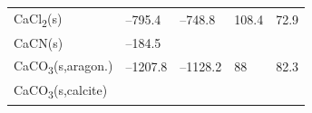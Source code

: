 \documentclass[
]{book}
\theoremstyle{definition}
\theoremstyle{definition}
\theoremstyle{definition}
\theoremstyle{remark}
\begin{document}
\begin{longtable}[]{@{}lllll@{}}
\begin{minipage}[t]{0.10\columnwidth}
CaCl\textsubscript{2}(s)\strut
\end{minipage} & \begin{minipage}[t]{0.19\columnwidth}\raggedright
--795.4\strut
\end{minipage} & \begin{minipage}[t]{0.20\columnwidth}\raggedright
--748.8\strut
\end{minipage} & \begin{minipage}[t]{0.18\columnwidth}\raggedright
108.4\strut
\end{minipage} & \begin{minipage}[t]{0.18\columnwidth}\raggedright
72.9\strut
\end{minipage}\tabularnewline
\begin{minipage}[t]{0.10\columnwidth}\raggedright
CaCN(s)\strut
\end{minipage} & \begin{minipage}[t]{0.19\columnwidth}\raggedright
--184.5\strut
\end{minipage} & \begin{minipage}[t]{0.20\columnwidth}\raggedright
\strut
\end{minipage} & \begin{minipage}[t]{0.18\columnwidth}\raggedright
\strut
\end{minipage} & \begin{minipage}[t]{0.18\columnwidth}\raggedright
\strut
\end{minipage}\tabularnewline
\begin{minipage}[t]{0.10\columnwidth}\raggedright
CaCO\textsubscript{3}(s,aragon.)\strut
\end{minipage} & \begin{minipage}[t]{0.19\columnwidth}\raggedright
--1207.8\strut
\end{minipage} & \begin{minipage}[t]{0.20\columnwidth}\raggedright
--1128.2\strut
\end{minipage} & \begin{minipage}[t]{0.18\columnwidth}\raggedright
88\strut
\end{minipage} & \begin{minipage}[t]{0.18\columnwidth}\raggedright
82.3\strut
\end{minipage}\tabularnewline
\begin{minipage}[t]{0.10\columnwidth}\raggedright
CaCO\textsubscript{3}(s,calcite)\strut
\end{minipage} & \begin{minipage}[t]{0.19\columnwidth}\raggedright

\end{minipage}
\end{longtable}
\end{document}
